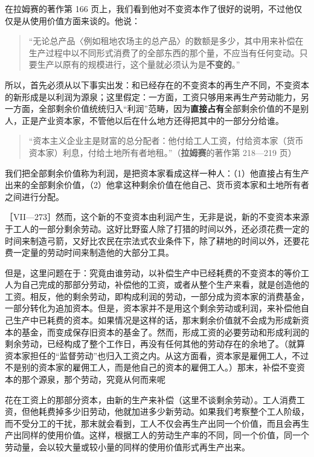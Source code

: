 \fontbox{~\{}在拉姆赛的著作第 166 页上，我们看到他对不变资本作了很好的说明，不过他仅仅是从使用价值方面来谈的。他说：

\begin{quote}“无论总产品〈例如租地农场主的总产品〉的数额是多少，其中用来补偿在生产过程中以不同形式消费了的全部东西的那个量，不应当有任何变动。只要生产以原有的规模进行，这个量就必须认为是\textbf{不变的}。”\fontbox{\}~}\end{quote}

所以，首先必须从以下事实出发：和已经存在的不变资本的再生产不同，不变资本的新形成是以利润为源泉；这里假定：一方面，工资只够用来再生产劳动能力，另一方面，全部剩余价值统统归入“利润”范畴，因为\textbf{直接占有}全部剩余价值的不是别人，正是产业资本家，不管他以后在什么地方还得把其中的一部分分给谁。

\begin{quote}\fontbox{~\{}“资本主义企业主是财富的总分配者：他付给工人工资，付给资本家（货币资本家）利息，付给土地所有者地租。”（\textbf{拉姆赛}的著作第 218—219 页）\end{quote}

我们把全部剩余价值称为利润，是把资本家看成这样一种人：（1）他直接占有生产出来的全部剩余价值，（2）他拿这种剩余价值在他自己、货币资本家和土地所有者之间进行分配。\fontbox{\}~}

［VII—273］然而，这个新的不变资本由利润产生，无非是说，新的不变资本来源于工人的一部分剩余劳动。这好比野蛮人除了打猎的时间以外，还必须花费一定的时间来制造弓箭，又好比农民在宗法式农业条件下，除了耕地的时间以外，还要花费一定量的劳动时间来制造他的大部分工具。

但是，这里问题在于：究竟由谁劳动，以补偿生产中已经耗费的不变资本的等价工人为自己完成的那部分劳动，补偿他的工资，或者从整个生产来看，就是创造他的工资。相反，他的剩余劳动，即构成利润的劳动，一部分成为资本家的消费基金，一部分转化为追加资本。但是，资本家并不是用这个剩余劳动或利润，来补偿他自己生产中已耗费的资本。\fontbox{~\{}如果情况是这样的话，那末剩余价值就不会成为形成新资本的基金，而变成保存旧资本的基金了。\fontbox{\}~}然而，形成工资的必要劳动和形成利润的剩余劳动，已经构成了整个工作日，再没有任何其他的劳动存在的余地了。（就算资本家担任的“监督劳动”也归入工资之内。从这方面看，资本家是雇佣工人，不过不是别的资本家的雇佣工人，而是他自己的资本的雇佣工人。）那末，补偿不变资本的那个源泉，那个劳动，究竟从何而来呢

花在工资上的那部分资本，由新的生产来补偿（这里不谈剩余劳动）。工人消费工资，但他耗费掉多少旧劳动，他就加进多少新劳动。如果我们考察整个工人阶级，而不受分工的干扰，那末就会看到，工人不仅会再生产出同一个价值，而且会再生产出同样的使用价值。这样，根据工人的劳动生产率的不同，同一个价值，同一个劳动量，会以较大量或较小量的同样的使用价值形式再生产出来。

